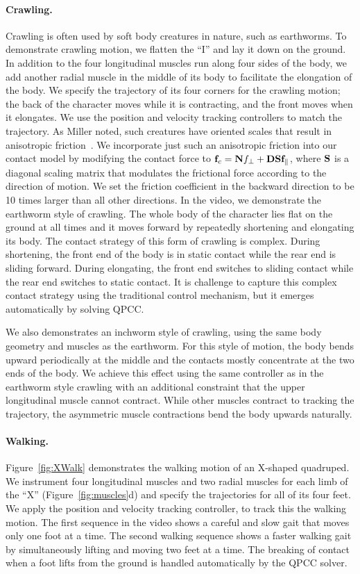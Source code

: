 \paragraph{Crawling.} Crawling is often used by soft body creatures in
nature, such as earthworms.  To demonstrate crawling motion, we
flatten the ``I'' and lay it down on the ground. In addition to the
four longitudinal muscles run along four sides of the body, we add
another radial muscle in the middle of its body to facilitate the
elongation of the body. We specify the trajectory of its four
corners for the crawling motion; the back of the character moves while
it is contracting, and the front moves when it elongates.  We use the
position and velocity tracking controllers to match the trajectory. As
Miller noted, such creatures have oriented scales that result in
anisotropic friction~\cite{Miller:1988}.  We incorporate just such an
anisotropic friction into our contact model by modifying the contact
force to $\mathbf{f}_c=\mathbf{N}f_\perp+\mathbf{DS}\mathbf{f}_\parallel$, where
$\mathbf{S}$ is a diagonal scaling matrix that modulates the frictional
force according to the direction of motion. We set the friction
coefficient in the backward direction to be 10 times larger than all
other directions. In the video, we demonstrate the
earthworm style of crawling. The whole body of the character lies flat
on the ground at all times and it moves forward by repeatedly
shortening and elongating its body. The contact strategy of this form
of crawling is complex. During shortening, the front end of the body
is in static contact while the rear end is sliding forward. During
elongating, the front end switches to sliding contact while the rear
end switches to static contact. It is challenge to capture this
complex contact strategy using the traditional control mechanism, but
it emerges automatically by solving QPCC.

We also demonstrates an inchworm style of crawling, using the same
body geometry and muscles as the earthworm. For this style of motion,
the body bends upward periodically at the middle and the contacts
mostly concentrate at the two ends of the body. We achieve this effect
using the same controller as in the earthworm style crawling with an
additional constraint that the upper longitudinal muscle cannot
contract.  While other muscles contract to tracking the trajectory,
the asymmetric muscle contractions bend the body upwards naturally.

\paragraph{Walking.} Figure~\ref{fig:XWalk} demonstrates the walking
motion of an X-shaped quadruped. We instrument four longitudinal
muscles and two radial muscles for each limb of the ``X''
(Figure~\ref{fig:muscles}d) and specify the trajectories for all of
its four feet. We apply the position and velocity tracking controller, to track this the walking motion.
The first sequence in the video shows a careful and slow gait that moves only one
foot at a time. The second walking sequence shows a faster walking
gait by simultaneously lifting and moving two feet at a time. The
breaking of contact when a foot lifts from the ground is handled
automatically by the QPCC solver.

